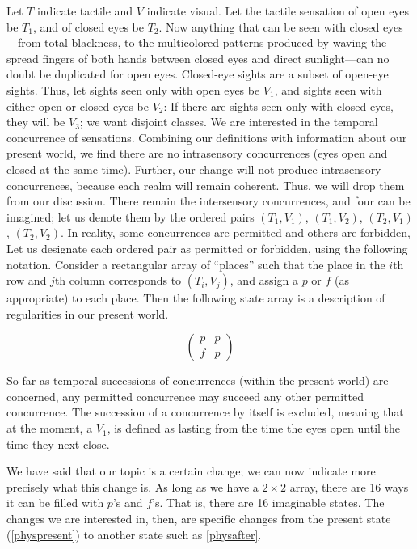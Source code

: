 Let $T$ indicate tactile and $V$ indicate visual. Let the tactile sensation of open eyes be $T_1$, and of closed eyes be $T_2$. Now anything that can be seen with closed eyes---from total blackness, to the multicolored patterns produced by waving the spread fingers of both hands between closed eyes and direct sunlight---can no doubt be duplicated for open eyes. Closed-eye sights are a subset of open-eye sights. Thus, let sights seen only with open eyes be $V_1$, and sights seen with either open or closed eyes be $V_2$: If there are sights seen only with closed eyes, they will be $V_3$; we want disjoint classes. We are interested in the temporal concurrence of sensations. Combining our definitions with information about our present world, we find there are no intrasensory concurrences (eyes open and closed at the same time). Further, our change will not produce intrasensory concurrences, because each realm will remain coherent. Thus, we will drop them from our discussion. There remain the intersensory concurrences, and four can be imagined; let us denote them by the ordered pairs $(T_1, V_1)$, $(T_1, V_2)$, $(T_2, V_1)$, $(T_2, V_2)$. In reality, some concurrences are permitted and others are forbidden, Let us designate each ordered pair as permitted or forbidden, using the following notation. Consider a rectangular array of \enquote{places} such that the place in the $i$th row and $j$th column corresponds to $(T_i, V_j)$, and assign a $p$ or $f$ (as appropriate) to each place. Then the following state array is a description of regularities in our present world. 

\begin{equation}\begin{pmatrix}	p & p\\	f & p \end{pmatrix}\end{equation}


So far as temporal successions of concurrences (within the present world) are concerned, any permitted concurrence may succeed any other permitted concurrence. The succession of a concurrence by itself is excluded, meaning that at the moment, a $V_1$, is defined as lasting from the time the eyes open until the time they next close. 

We have said that our topic is a certain change; we can now indicate more precisely what this change is. As long as we have a $2\times2$ array, there are 16 ways it can be filled with $p$'s and $f$'s. That is, there are 16 imaginable states. The changes we are interested in, then, are specific changes from the present state (\ref{physpresent}) to another state such as \ref{physafter}.

